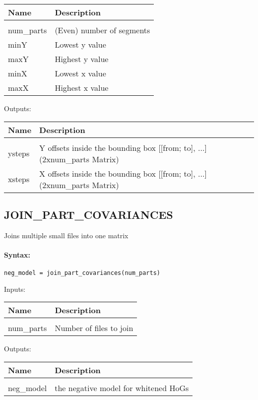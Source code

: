 \begin{tabular}{|l|p{5cm}|}
\hline
\textbf{Name} & \textbf{Description} \\
\hline \hline \\
num\_parts & (Even) number of segments  \\ \hline
minY & Lowest y value  \\ \hline
maxY & Highest y value  \\ \hline
minX & Lowest x value  \\ \hline
maxX & Highest x value  \\ \hline
\end{tabular}
Outputs:

\begin{tabular}{|l|p{5cm}|}
\hline
\textbf{Name} & \textbf{Description} \\
\hline \hline \\
ysteps & Y offsets inside the bounding box [[from; to], ...] (2xnum\_parts Matrix)  \\ \hline
xsteps & X offsets inside the bounding box [[from; to], ...] (2xnum\_parts Matrix)  \\ \hline
\end{tabular}

\subsection{JOIN\_PART\_COVARIANCES}

Joins multiple small files into one matrix

\paragraph{Syntax:} \verb|neg_model = join_part_covariances(num_parts)|

Inputs:

\begin{tabular}{|l|p{5cm}|}
\hline
\textbf{Name} & \textbf{Description} \\
\hline \hline \\
num\_parts & Number of files to join  \\ \hline
\end{tabular}
Outputs:

\begin{tabular}{|l|p{5cm}|}
\hline
\textbf{Name} & \textbf{Description} \\
\hline \hline \\
neg\_model & the negative model for whitened HoGs  \\ \hline
\end{tabular}

